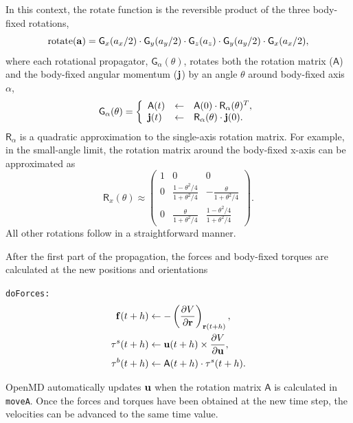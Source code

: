 \documentclass[]{book}
\begin{document}
In this context, the $\mathrm{rotate}$ function is the reversible product
of the three body-fixed rotations,
\begin{equation}
\mathrm{rotate}({\bf a}) = \mathsf{G}_x(a_x / 2) \cdot
\mathsf{G}_y(a_y / 2) \cdot \mathsf{G}_z(a_z) \cdot \mathsf{G}_y(a_y /
2) \cdot \mathsf{G}_x(a_x /2),
\end{equation}
where each rotational propagator, $\mathsf{G}_\alpha(\theta)$, rotates
both the rotation matrix ($\mathsf{A}$) and the body-fixed angular
momentum (${\bf j}$) by an angle $\theta$ around body-fixed axis
$\alpha$,
\begin{equation}
\mathsf{G}_\alpha( \theta ) = \left\{
\begin{array}{lcl}
\mathsf{A}(t) & \leftarrow & \mathsf{A}(0) \cdot \mathsf{R}_\alpha(\theta)^T, \\
{\bf j}(t) & \leftarrow & \mathsf{R}_\alpha(\theta) \cdot {\bf j}(0).
\end{array}
\right.
\end{equation}
$\mathsf{R}_\alpha$ is a quadratic approximation to
the single-axis rotation matrix.  For example, in the small-angle
limit, the rotation matrix around the body-fixed x-axis can be
approximated as
\begin{equation}
\mathsf{R}_x(\theta) \approx \left(
\begin{array}{ccc}
1 & 0 & 0 \\
0 & \frac{1-\theta^2 / 4}{1 + \theta^2 / 4}  & -\frac{\theta}{1+
\theta^2 / 4} \\
0 & \frac{\theta}{1+
\theta^2 / 4} & \frac{1-\theta^2 / 4}{1 + \theta^2 / 4}
\end{array}
\right).
\end{equation}
All other rotations follow in a straightforward manner.

After the first part of the propagation, the forces and body-fixed
torques are calculated at the new positions and orientations

{\tt doForces:}
\begin{align*}
{\bf f}(t + h) &\leftarrow  
	- \left(\frac{\partial V}{\partial {\bf r}}\right)_{{\bf r}(t + h)}, \\
%
{\bf \tau}^{s}(t + h) &\leftarrow {\bf u}(t + h)
	\times \frac{\partial V}{\partial {\bf u}}, \\
%
{\bf \tau}^{b}(t + h) &\leftarrow \mathsf{A}(t + h)
	\cdot {\bf \tau}^s(t + h).
\end{align*}

{\sc OpenMD} automatically updates ${\bf u}$ when the rotation matrix
$\mathsf{A}$ is calculated in {\tt moveA}.  Once the forces and
torques have been obtained at the new time step, the velocities can be
advanced to the same time value.
\end{document}
